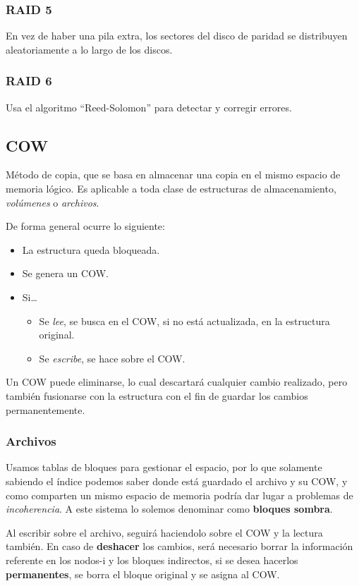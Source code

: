 \subsubsection{RAID 5}
\noindent En vez de haber una pila extra, los sectores del disco de paridad se distribuyen aleatoriamente a lo largo de los discos.
\subsubsection{RAID 6}
\noindent Usa el algoritmo ``Reed-Solomon'' para detectar y corregir errores.
\subsection{COW}
\noindent Método de copia, que se basa en almacenar una copia en el mismo espacio de memoria lógico. Es aplicable a toda clase de estructuras de almacenamiento, \textit{volúmenes} o \textit{archivos}. %
\par \noindent De forma general ocurre lo siguiente:
\begin{itemize}
        \item La estructura queda bloqueada.
        \item Se genera un COW.
        \item Si\dots
              \begin{itemize}
                      \item Se \textit{lee}, se busca en el COW, si no está actualizada, en la estructura original.
                      \item Se \textit{escribe}, se hace sobre el COW.
              \end{itemize}
\end{itemize}
\noindent Un COW puede eliminarse, lo cual descartará cualquier cambio realizado, pero también fusionarse con la estructura con el fin de guardar los cambios permanentemente.
\subsubsection{Archivos}
\noindent Usamos tablas de bloques para gestionar el espacio, por lo que solamente sabiendo el índice podemos saber donde está guardado el archivo y su COW, y como comparten un mismo espacio de memoria podría dar lugar a problemas de \textit{incoherencia}. A este sistema lo solemos denominar como \textbf{bloques sombra}.
\par \noindent Al escribir sobre el archivo, seguirá haciendolo sobre el COW y la lectura también. En caso de \textbf{deshacer} los cambios, será necesario borrar la información referente en los nodos-i y los bloques indirectos, si se desea hacerlos \textbf{permanentes}, se borra el bloque original y se asigna al COW.
